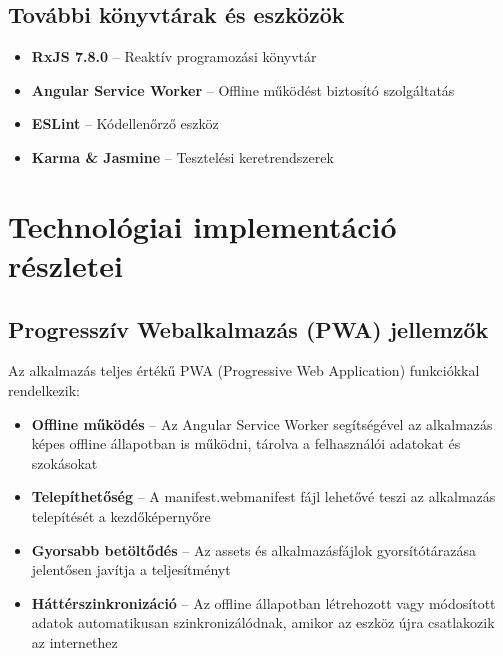 \documentclass[12pt]{report}
\begin{document}
\subsection{További könyvtárak és eszközök}
\begin{itemize}
    \item \textbf{RxJS 7.8.0} -- Reaktív programozási könyvtár
    \item \textbf{Angular Service Worker} -- Offline működést biztosító szolgáltatás
    \item \textbf{ESLint} -- Kódellenőrző eszköz
    \item \textbf{Karma \& Jasmine} -- Tesztelési keretrendszerek
\end{itemize}
\section{Technológiai implementáció részletei}

\subsection{Progresszív Webalkalmazás (PWA) jellemzők}
Az alkalmazás teljes értékű PWA (Progressive Web Application) funkciókkal rendelkezik:
\begin{itemize}
    \item \textbf{Offline működés} -- Az Angular Service Worker segítségével az alkalmazás képes offline állapotban is működni, tárolva a felhasználói adatokat és szokásokat
    \item \textbf{Telepíthetőség} -- A manifest.webmanifest fájl lehetővé teszi az alkalmazás telepítését a kezdőképernyőre
    \item \textbf{Gyorsabb betöltődés} -- Az assets és alkalmazásfájlok gyorsítótárazása jelentősen javítja a teljesítményt
    \item \textbf{Háttérszinkronizáció} -- Az offline állapotban létrehozott vagy módosított adatok automatikusan szinkronizálódnak, amikor az eszköz újra csatlakozik az internethez
\end{itemize}
\end{document}
